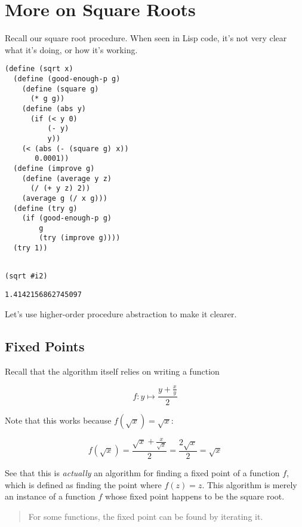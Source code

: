 \documentclass[9pt]{report}
\begin{document}
\section{More on Square Roots}
\label{sec:orgb780dc4}

Recall our square root procedure. When seen in Lisp code, it's not
very clear what it's doing, or how it's working.

\begin{verbatim}
(define (sqrt x)
  (define (good-enough-p g)
    (define (square g)
      (* g g))
    (define (abs y)
      (if (< y 0)
          (- y)
          y))
    (< (abs (- (square g) x))
       0.0001))
  (define (improve g)
    (define (average y z)
      (/ (+ y z) 2))
    (average g (/ x g)))
  (define (try g)
    (if (good-enough-p g)
        g
        (try (improve g))))
  (try 1))
\end{verbatim}

\begin{verbatim}

(sqrt #i2)
\end{verbatim}

\begin{verbatim}
1.4142156862745097
\end{verbatim}


Let's use higher-order procedure abstraction to make it clearer.

\subsection{Fixed Points}
\label{sec:org250ae1f}

Recall that the algorithm itself relies on writing a function

$$f\colon y\mapsto \frac{y+\frac{x}{y}}{2}$$

Note that this works because \(f(\sqrt{x}) = \sqrt{x}\):

$$f(\sqrt{x})=\frac{\sqrt{x}+\frac{x}{\sqrt{x}}}{2} = \frac{2\sqrt{x}}{2} = \sqrt{x}$$

See that this is \emph{actually} an algorithm for finding a fixed point
of a function \(f\), which is defined as finding the point where
\(f(z)=z\). This algorithm is merely an instance of a function \(f\)
whose fixed point happens to be the square root.

\begin{quote}
For some functions, the fixed point can be found by iterating it.
\end{quote}
\end{document}
